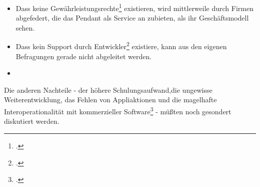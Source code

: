 \documentclass[DIV=calc,BCOR=5mm,11pt,headings=small,oneside,abstract=true, toc=bib]{scrartcl}
\begin{document}
\begin{itemize}
  \item Dass \glqq{}keine
  Gewährleistungsrechte\grqq{}\footcite[vgl.][17]{RenVetRexKet2005a} existieren,
  wird mittlerweile durch Firmen abgefedert, die das Pendant als Service an
  zubieten, als ihr Geschäftsmodell sehen.
  \item Dass \glqq{}kein
  Support durch Entwickler\grqq{}\footcite[vgl.][17]{RenVetRexKet2005a} existiere, kann
  aus den eigenen Befragungen gerade nicht abgeleitet werden.
  \item 
\end{itemize}

Die anderen Nachteile - der \glqq{}höhere Schulungsaufwand\grqq{},die 
\glqq{}ungewisse Weiterentwicklung\grqq{}, das Fehlen von Appliaktionen und die
\glqq{}magelhafte Interoperationalität mit kommerzieller
Software\grqq{}\footcite[vgl.][18]{RenVetRexKet2005a} - müßten noch gesondert diskutiert
werden.
\small

\end{document}
